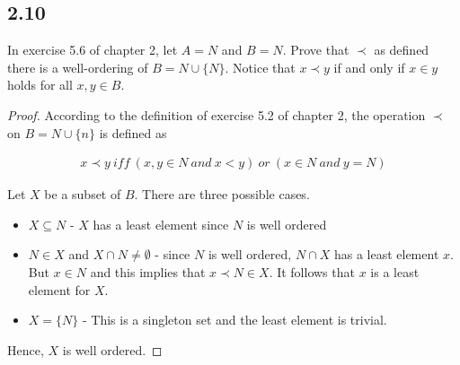 \subsection*{2.10} In exercise 5.6 of chapter 2, let $A=N$ and $B=N$. Prove that $\prec$ as defined there is a well-ordering of $B = N \cup \{N\}$. Notice that $x \prec y$ if and only if $x \in y$ holds for all $x,y\in B$.

\begin{proof}
According to the definition of exercise 5.2 of chapter 2, the operation $\prec$ on $B = N \cup \{n\}$ is defined as

\begin{align*}
    x \prec y~iff~(x,y\in N~and~x < y)~or~(x \in N~and~y=N)
\end{align*}

Let $X$ be a subset of $B$. There are three possible cases.

\begin{itemize}
    \item $X \subseteq N$ - $X$ has a least element since $N$ is well ordered
    \item $N \in X$ and $X \cap N \neq \emptyset$ - since $N$ is well ordered, $N \cap X$ has a least element $x$. But $x \in N$ and this implies that $x \prec N \in X$. It follows that $x$ is a least element for $X$.
    \item $X = \{N\}$ - This is a singleton set and the least element is trivial.
\end{itemize}

Hence, $X$ is well ordered.


\end{proof}


